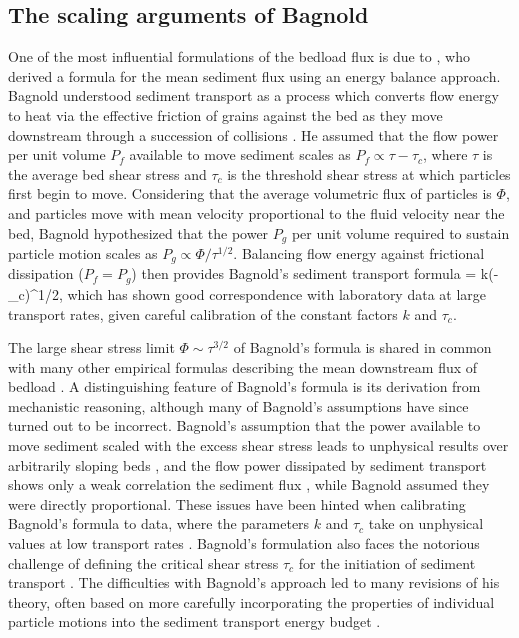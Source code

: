 \subsection{The scaling arguments of Bagnold}

One of the most influential formulations of the bedload flux is due to \citet{Bagnold1956,Bagnold1966}, who derived a formula for the mean sediment flux using an energy balance approach.
Bagnold understood sediment transport as a process which converts flow energy to heat via the effective friction \citep{Bagnold1954} of grains against the bed as they move downstream through a succession of collisions \citep{Bagnold1973}.
He assumed that the flow power per unit volume $P_f$ available to move sediment scales as $P_f \propto \tau - \tau_c$, where $\tau$ is the average bed shear stress and $\tau_c$ is the threshold shear stress at which particles first begin to move. 
Considering that the average volumetric flux of particles is $\Phi$, and particles move with mean velocity proportional to the fluid velocity near the bed, Bagnold hypothesized that the power $P_g$ per unit volume required to sustain particle motion scales as $P_g \propto \Phi/\tau^{1/2}.$
Balancing flow energy against frictional dissipation ($P_f = P_g$) then provides Bagnold's sediment transport formula
\be \Phi = k(\tau-\tau_c)\tau^{1/2}, \label{eq:bagnold}\ee
which has shown good correspondence with laboratory data at large transport rates, given careful calibration of the constant factors $k$ and $\tau_c$.

The large shear stress limit $\Phi \sim \tau^{3/2}$ of Bagnold's formula is shared in common with many other empirical formulas describing the mean downstream flux of bedload \citep[e.g.][]{MeyerPeter1948, Yalin1972, Wilcock2003, Parker1990}. A distinguishing feature of Bagnold's formula is its derivation from mechanistic reasoning, although many of Bagnold's assumptions have since turned out to be incorrect.
Bagnold's assumption that the power available to move sediment scaled with the excess shear stress leads to unphysical results over arbitrarily sloping beds \citep{Seminara2002}, and the flow power dissipated by sediment transport shows only a weak correlation the sediment flux \citep{Ancey2008}, while Bagnold assumed they were directly proportional. These issues have been hinted when calibrating Bagnold's formula to data, where the parameters $k$ and $\tau_c$ take on unphysical values at low transport rates \citep{Nino1996}.
Bagnold's formulation also faces the notorious challenge of defining the critical shear stress $\tau_c$ for the initiation of sediment transport \citep{Paintal1971,Kirchener1990,Houssais2015,Clark2017,Allen2018}.
The difficulties with Bagnold's approach led to many revisions of his theory, often based on more carefully incorporating the properties of individual particle motions into the sediment transport energy budget \citep{Engelund1976,Luque1976,Nino1998,Martin2000}.

